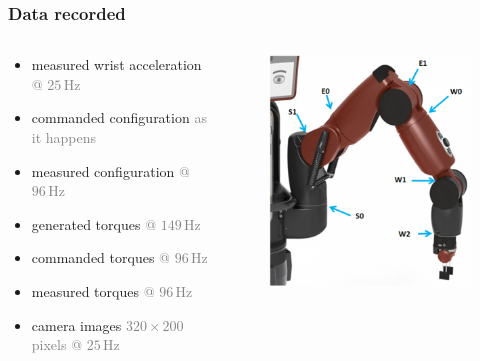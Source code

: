 \documentclass{beamer}
\newcommand{\info}[1]{{\footnotesize\textcolor{gray}{#1}}}
\newcommand{\unit}[2]{\ensuremath{#1\,\mathrm{#2}}}
\begin{document}
    \begin{frame}
    	\frametitle{Data recorded}
        \begin{columns}[onlytextwidth]
            \begin{column}{.7\textwidth}
                \begin{itemize}
                    \item measured wrist acceleration \info{@ \unit{25}{Hz}}
                    \item commanded configuration \info{as it happens}
                    \item measured configuration \info{@ \unit{96}{Hz}}
                    \item generated torques \info{@ \unit{149}{Hz}}
                    \item commanded torques \info{@ \unit{96}{Hz}}
                    \item measured torques \info{@ \unit{96}{Hz}}
                    \item camera images \info{$320\times 200$ pixels @ \unit{25}{Hz}}
                \end{itemize}
            \end{column}
            \begin{column}{.3\textwidth}
                \begin{figure}
                    \centering
                    \includegraphics[width=.9\columnwidth]{figs/baxterjoints}
                \end{figure}
            \end{column}
        \end{columns}
    \end{frame}
\end{document}
